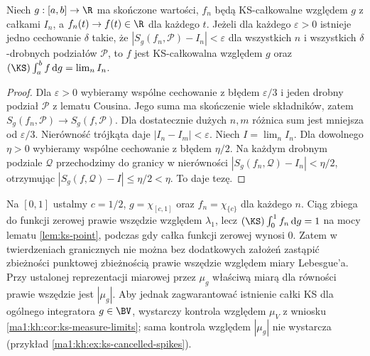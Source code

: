 \begin{twierdzenie}\label{it:thm:ks-equiintegrability}
Niech $g:[a,b]\to\R$ ma skończone wartości, $f_n$ będą
KS-całkowalne względem $g$ z całkami $I_n$, a
$f_n(t)\to f(t)\in\R$ dla każdego $t$.
Jeżeli dla każdego $\varepsilon>0$ istnieje jedno
cechowanie $\delta$ takie, że
$|S_g(f_n,\mathcal P)-I_n|<\varepsilon$ dla wszystkich $n$
i wszystkich $\delta$-drobnych podziałów $\mathcal P$,
to $f$ jest KS-całkowalna względem $g$ oraz
$(\KS)\int_a^b f\,\mathrm dg=\lim_n I_n$.
\end{twierdzenie}
\begin{proof}
Dla $\varepsilon>0$ wybieramy wspólne cechowanie z błędem
$\varepsilon/3$ i jeden drobny podział $\mathcal P$
z lematu Cousina. Jego suma ma skończenie wiele składników,
zatem $S_g(f_n,\mathcal P)\to S_g(f,\mathcal P)$.
Dla dostatecznie dużych $n,m$ różnica sum jest mniejsza
od $\varepsilon/3$. Nierówność trójkąta daje
$|I_n-I_m|<\varepsilon$. Niech $I=\lim_n I_n$.
Dla dowolnego $\eta>0$ wybieramy wspólne cechowanie
z błędem $\eta/2$. Na każdym drobnym podziale $\mathcal Q$
przechodzimy do granicy w nierówności
$|S_g(f_n,\mathcal Q)-I_n|<\eta/2$, otrzymując
$|S_g(f,\mathcal Q)-I|\le\eta/2<\eta$. To daje tezę.
\end{proof}

\begin{przyklad}\label{it:ex:ks-atom-convergence}
Na $[0,1]$ ustalmy $c=1/2$, $g=\chi_{[c,1]}$
oraz $f_n=\chi_{\{c\}}$ dla każdego $n$. Ciąg zbiega
do funkcji zerowej prawie wszędzie względem $\lambda_1$,
lecz $(\KS)\int_0^1 f_n\,\mathrm dg=1$ na mocy
lematu \ref{lem:ks-point}, podczas gdy całka funkcji
zerowej wynosi $0$. Zatem w twierdzeniach granicznych
nie można bez dodatkowych założeń zastąpić zbieżności
punktowej zbieżnością prawie wszędzie względem miary
Lebesgue'a. Przy ustalonej reprezentacji miarowej przez $\mu_g$ właściwą miarą dla równości prawie wszędzie jest $|\mu_g|$. Aby jednak zagwarantować istnienie całki KS dla ogólnego integratora $g\in\BV$, wystarczy kontrola względem $\mu_V$ z wniosku \ref{ma1:kh:cor:ks-measure-limits}; sama kontrola względem $|\mu_g|$ nie wystarcza (przykład \ref{ma1:kh:ex:ks-cancelled-spikes}).
\end{przyklad}


